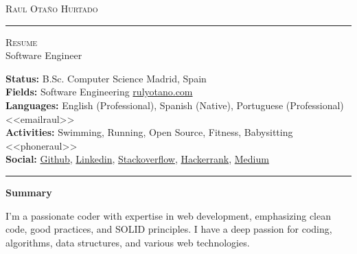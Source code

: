 \documentclass[10pt,A4]{article}
\newcommand{\cvsection}[1]
{
	\begin{center}
		\large\textcolor{sectcol}{\textbf{#1}}
	\end{center}
}
\newcommand{\metasection}[2]
{
\footnotesize{#2} \hspace*{\fill} \footnotesize{#1}\\[1pt]
}
\begin{document}



\vspace{-8pt}
\begin{center}
	\HUGE \textsc{Raul Otaño Hurtado} \textcolor{sectcol}{\rule[-1mm]{1mm}{0.9cm}} \textsc{Resume}\\[2pt]
	\small Software Engineer
\end{center}



\vspace{6pt}


\metasection{Madrid, Spain}{\textbf{Status:} B.Sc. Computer Science}
\metasection{\href{https://rulyotano.com}{rulyotano.com}}{\textbf{Fields:} Software Engineering} 
\metasection{<<emailraul>>}{\textbf{Languages:} English (Professional), Spanish (Native), Portuguese (Professional)}
\metasection{<<phoneraul>>}{\textbf{Activities:} Swimming, Running, Open Source, Fitness, Babysitting}
\metasection{}{\textbf{Social:} \href{https://github.com/rulyotano}{Github}, \href{https://www.linkedin.com/in/raulotanohurtado}{Linkedin}, \href{https://stackoverflow.com/users/1655482}{Stackoverflow}, \href{https://www.hackerrank.com/rulyotano}{Hackerrank}, \href{https://medium.com/@rulyotano}{Medium}}
\vspace{-2pt}
\textcolor{softcol}{\hrule}
\vspace{6pt}

\normalsize

\vspace{-6pt}
\cvsection{Summary}
I'm a passionate coder with expertise in web development, emphasizing clean code, good practices, and SOLID principles. I have a deep passion for coding, algorithms, data structures, and various web technologies.\\
\end{document}
